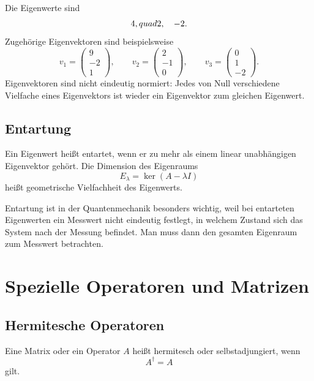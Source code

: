 \begin{answerbox}
Die Eigenwerte sind
\[
    4,\\quad 2,\quad -2.
\]
Zugehörige Eigenvektoren sind beispielsweise
\[
    v_1=\begin{pmatrix}9\\-2\\1\end{pmatrix},
    \qquad
    v_2=\begin{pmatrix}2\\-1\\0\end{pmatrix},
    \qquad
    v_3=\begin{pmatrix}0\\1\\-2\end{pmatrix}.
\]
Eigenvektoren sind nicht eindeutig normiert: Jedes von Null verschiedene Vielfache eines Eigenvektors ist wieder ein Eigenvektor zum gleichen Eigenwert.
\end{answerbox}

\subsection{Entartung}

Ein Eigenwert heißt entartet, wenn er zu mehr als einem linear unabhängigen Eigenvektor gehört. Die Dimension des Eigenraums
\[
    E_\lambda=\ker(A-\lambda I)
\]
heißt geometrische Vielfachheit des Eigenwerts.

\begin{conceptbox}
Entartung ist in der Quantenmechanik besonders wichtig, weil bei entarteten Eigenwerten ein Messwert nicht eindeutig festlegt, in welchem Zustand sich das System nach der Messung befindet. Man muss dann den gesamten Eigenraum zum Messwert betrachten.
\end{conceptbox}

\section{Spezielle Operatoren und Matrizen}

\subsection{Hermitesche Operatoren}

\begin{definitionbox}
Eine Matrix oder ein Operator $A$ heißt hermitesch oder selbstadjungiert, wenn
\[
    A^\dagger=A
\]
gilt.
\end{definitionbox}

